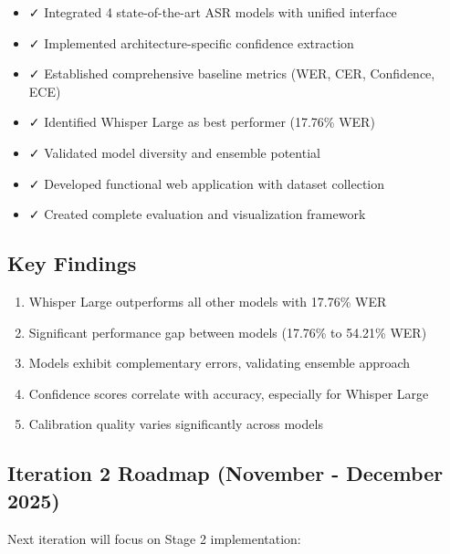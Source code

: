 \begin{itemize}
    \item ✓ Integrated 4 state-of-the-art ASR models with unified interface
    \item ✓ Implemented architecture-specific confidence extraction
    \item ✓ Established comprehensive baseline metrics (WER, CER, Confidence, ECE)
    \item ✓ Identified Whisper Large as best performer (17.76\% WER)
    \item ✓ Validated model diversity and ensemble potential
    \item ✓ Developed functional web application with dataset collection
    \item ✓ Created complete evaluation and visualization framework
\end{itemize}

\subsection{Key Findings}

\begin{enumerate}
    \item Whisper Large outperforms all other models with 17.76\% WER
    \item Significant performance gap between models (17.76\% to 54.21\% WER)
    \item Models exhibit complementary errors, validating ensemble approach
    \item Confidence scores correlate with accuracy, especially for Whisper Large
    \item Calibration quality varies significantly across models
\end{enumerate}

\subsection{Iteration 2 Roadmap (November - December 2025)}

Next iteration will focus on Stage 2 implementation:


